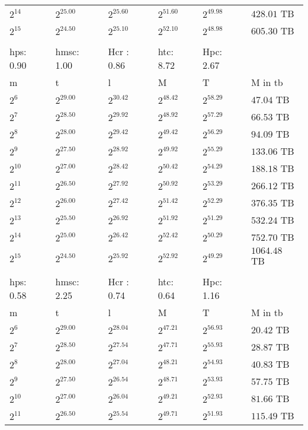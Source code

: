 \begin{tabular}{llllll}
$2^{14}$ & $2^{25.00}$ & $2^{25.60}$ & $2^{51.60}$ & $2^{49.98}$ & $428.01$ TB \\
$2^{15}$ & $2^{24.50}$ & $2^{25.10}$ & $2^{52.10}$ & $2^{48.98}$ & $605.30$ TB \\
 &  &  &  &  &  \\
hps: 0.90 & hmsc: 1.00 & Hcr : 0.86 & htc: 8.72 & Hpc: 2.67 &  \\
m & t & l & M & T & M in tb \\
$2^{6}$ & $2^{29.00}$ & $2^{30.42}$ & $2^{48.42}$ & $2^{58.29}$ & $47.04$ TB \\
$2^{7}$ & $2^{28.50}$ & $2^{29.92}$ & $2^{48.92}$ & $2^{57.29}$ & $66.53$ TB \\
$2^{8}$ & $2^{28.00}$ & $2^{29.42}$ & $2^{49.42}$ & $2^{56.29}$ & $94.09$ TB \\
$2^{9}$ & $2^{27.50}$ & $2^{28.92}$ & $2^{49.92}$ & $2^{55.29}$ & $133.06$ TB \\
$2^{10}$ & $2^{27.00}$ & $2^{28.42}$ & $2^{50.42}$ & $2^{54.29}$ & $188.18$ TB \\
$2^{11}$ & $2^{26.50}$ & $2^{27.92}$ & $2^{50.92}$ & $2^{53.29}$ & $266.12$ TB \\
$2^{12}$ & $2^{26.00}$ & $2^{27.42}$ & $2^{51.42}$ & $2^{52.29}$ & $376.35$ TB \\
$2^{13}$ & $2^{25.50}$ & $2^{26.92}$ & $2^{51.92}$ & $2^{51.29}$ & $532.24$ TB \\
$2^{14}$ & $2^{25.00}$ & $2^{26.42}$ & $2^{52.42}$ & $2^{50.29}$ & $752.70$ TB \\
$2^{15}$ & $2^{24.50}$ & $2^{25.92}$ & $2^{52.92}$ & $2^{49.29}$ & $1064.48$ TB \\
 &  &  &  &  &  \\
hps: 0.58 & hmsc: 2.25 & Hcr : 0.74 & htc: 0.64 & Hpc: 1.16 &  \\
m & t & l & M & T & M in tb \\
$2^{6}$ & $2^{29.00}$ & $2^{28.04}$ & $2^{47.21}$ & $2^{56.93}$ & $20.42$ TB \\
$2^{7}$ & $2^{28.50}$ & $2^{27.54}$ & $2^{47.71}$ & $2^{55.93}$ & $28.87$ TB \\
$2^{8}$ & $2^{28.00}$ & $2^{27.04}$ & $2^{48.21}$ & $2^{54.93}$ & $40.83$ TB \\
$2^{9}$ & $2^{27.50}$ & $2^{26.54}$ & $2^{48.71}$ & $2^{53.93}$ & $57.75$ TB \\
$2^{10}$ & $2^{27.00}$ & $2^{26.04}$ & $2^{49.21}$ & $2^{52.93}$ & $81.66$ TB \\
$2^{11}$ & $2^{26.50}$ & $2^{25.54}$ & $2^{49.71}$ & $2^{51.93}$ & $115.49$ TB \\

\end{tabular}
